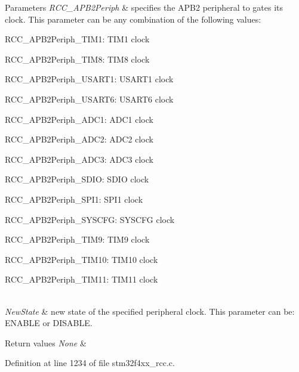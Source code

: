 \begin{DoxyParams}{Parameters}
{\em R\+C\+C\+\_\+\+A\+P\+B2\+Periph} & specifies the A\+P\+B2 peripheral to gates its clock. This parameter can be any combination of the following values\+: \begin{DoxyItemize}
\item R\+C\+C\+\_\+\+A\+P\+B2\+Periph\+\_\+\+T\+I\+M1\+: T\+I\+M1 clock \item R\+C\+C\+\_\+\+A\+P\+B2\+Periph\+\_\+\+T\+I\+M8\+: T\+I\+M8 clock \item R\+C\+C\+\_\+\+A\+P\+B2\+Periph\+\_\+\+U\+S\+A\+R\+T1\+: U\+S\+A\+R\+T1 clock \item R\+C\+C\+\_\+\+A\+P\+B2\+Periph\+\_\+\+U\+S\+A\+R\+T6\+: U\+S\+A\+R\+T6 clock \item R\+C\+C\+\_\+\+A\+P\+B2\+Periph\+\_\+\+A\+D\+C1\+: A\+D\+C1 clock \item R\+C\+C\+\_\+\+A\+P\+B2\+Periph\+\_\+\+A\+D\+C2\+: A\+D\+C2 clock \item R\+C\+C\+\_\+\+A\+P\+B2\+Periph\+\_\+\+A\+D\+C3\+: A\+D\+C3 clock \item R\+C\+C\+\_\+\+A\+P\+B2\+Periph\+\_\+\+S\+D\+IO\+: S\+D\+IO clock \item R\+C\+C\+\_\+\+A\+P\+B2\+Periph\+\_\+\+S\+P\+I1\+: S\+P\+I1 clock \item R\+C\+C\+\_\+\+A\+P\+B2\+Periph\+\_\+\+S\+Y\+S\+C\+FG\+: S\+Y\+S\+C\+FG clock \item R\+C\+C\+\_\+\+A\+P\+B2\+Periph\+\_\+\+T\+I\+M9\+: T\+I\+M9 clock \item R\+C\+C\+\_\+\+A\+P\+B2\+Periph\+\_\+\+T\+I\+M10\+: T\+I\+M10 clock \item R\+C\+C\+\_\+\+A\+P\+B2\+Periph\+\_\+\+T\+I\+M11\+: T\+I\+M11 clock \end{DoxyItemize}
\\
\hline
{\em New\+State} & new state of the specified peripheral clock. This parameter can be\+: E\+N\+A\+B\+LE or D\+I\+S\+A\+B\+LE. \\
\hline
\end{DoxyParams}

\begin{DoxyRetVals}{Return values}
{\em None} & \\
\hline
\end{DoxyRetVals}


Definition at line 1234 of file stm32f4xx\+\_\+rcc.\+c.

\mbox{\label{group___r_c_c___group3_ga30365b9e0b4c5d7e98c2675c862ddd7e}} 
